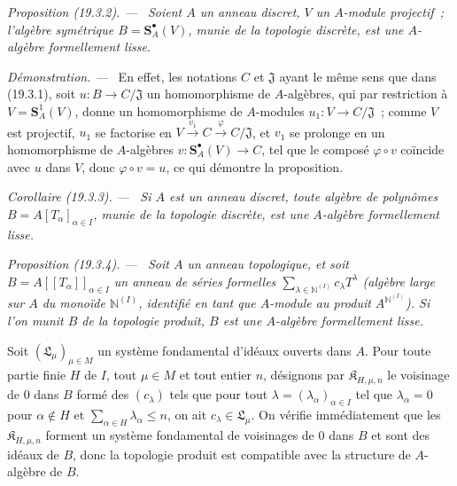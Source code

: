 \documentclass[10pt,oneside]{book}
\makeatletter
\newcommand{\setmanualcurrentlabel}[1]{\def\@currentlabel{#1}}
\newenvironment{proposition}[1][]{%
  \setmanualcurrentlabel{#1}\par\medskip\noindent\itshape Proposition (#1). ---\ }{\par}
\newenvironment{corollary}[1][]{%
  \setmanualcurrentlabel{#1}\par\medskip\noindent\itshape Corollaire (#1). ---\ }{\par}
\newenvironment{proof}{%
  \par\medskip\noindent\textit{Démonstration. ---\ }}{\par}
\makeatother
\begin{document}
\begin{proposition}[19.3.2]
\label{0.19.3.2-fr}
Soient $A$ un anneau discret, $V$ un $A$-module projectif~; l'algèbre
symétrique $B=\mathbf S_A^\bullet(V)$, munie de la topologie discrète, est une
$A$-algèbre formellement lisse.
\end{proposition}

\begin{proof}
En effet, les notations $C$ et $\mathfrak J$ ayant le même sens que dans
(19.3.1), soit $u:B\to C/\mathfrak J$ un homomorphisme de $A$-algèbres, qui
par restriction à $V=\mathbf S_A^1(V)$, donne un homomorphisme de $A$-modules
$u_1:V\to C/\mathfrak J$~; comme $V$ est projectif, $u_1$ se factorise en
$V\xrightarrow{v_1}C\xrightarrow{\varphi}C/\mathfrak J$, et $v_1$ se
prolonge en un homomorphisme de $A$-algèbres
$v:\mathbf S_A^\bullet(V)\to C$, tel que le composé
$\varphi\circ v$ coïncide avec $u$ dans $V$, donc
$\varphi\circ v=u$, ce qui démontre la proposition.
\end{proof}

\begin{corollary}[19.3.3]
\label{0.19.3.3-fr}
Si $A$ est un anneau discret, toute algèbre de polynômes
$B=A[T_\alpha]_{\alpha\in I}$, munie de la topologie discrète, est une
$A$-algèbre formellement lisse.
\end{corollary}

\begin{proposition}[19.3.4]
\label{0.19.3.4-fr}
Soit $A$ un anneau topologique, et soit
$B=A[[T_\alpha]]_{\alpha\in I}$ un anneau de séries formelles
$\sum_{\lambda\in\mathbb{N}^{(I)}}c_\lambda T^\lambda$ (algèbre large sur
$A$ du monoïde $\mathbb{N}^{(I)}$, identifié en tant que $A$-module au produit
$A^{\mathbb{N}^{(I)}}$). Si l'on munit $B$ de la topologie produit, $B$ est une
$A$-algèbre formellement lisse.
\end{proposition}

Soit $(\mathfrak L_\mu)_{\mu\in M}$ un système fondamental d'idéaux ouverts
dans $A$. Pour toute partie finie $H$ de $I$, tout $\mu\in M$ et tout entier
$n$, désignons par $\mathfrak K_{H,\mu,n}$ le voisinage de $0$ dans $B$ formé
des $(c_\lambda)$ tels que pour tout
$\lambda=(\lambda_\alpha)_{\alpha\in I}$ tel que
$\lambda_\alpha=0$ pour $\alpha\notin H$ et
$\sum_{\alpha\in H}\lambda_\alpha\leq n$, on ait
$c_\lambda\in\mathfrak L_\mu$. On vérifie immédiatement que les
$\mathfrak K_{H,\mu,n}$ forment un système fondamental de voisinages de $0$
dans $B$ et sont des idéaux de $B$, donc la topologie produit est compatible
avec la structure de $A$-algèbre de $B$.
\end{document}
